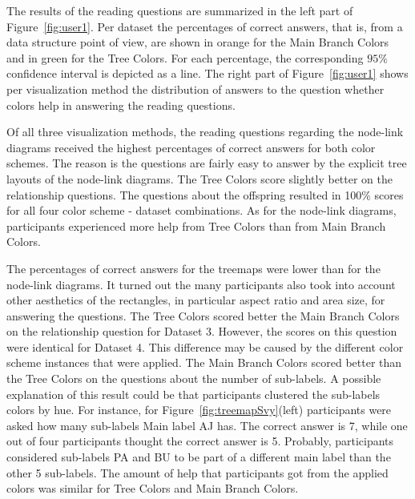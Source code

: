 \documentclass[review,journal]{vgtc}         %
\begin{document}
The results of the reading questions are summarized in the left part of Figure~\ref{fig:user1}. Per dataset the percentages of correct answers, that is, from a data structure point of view, are shown in orange for the Main Branch Colors and in green for the Tree Colors. For each percentage, the corresponding $95\%$ confidence interval is depicted as a line. The right part of Figure~\ref{fig:user1} shows per visualization method the distribution of answers to the question whether colors help in answering the reading questions.

Of all three visualization methods, the reading questions regarding the node-link diagrams received the highest percentages of correct answers for both color schemes. The reason is the questions are fairly easy to answer by the explicit tree layouts of the node-link diagrams. The Tree Colors score slightly better on the relationship questions. The questions about the offspring resulted in 100\% scores for all four color scheme - dataset combinations. As for the node-link diagrams, participants experienced more help from Tree Colors than from Main Branch Colors.


The percentages of correct answers for the treemaps were lower than for the node-link diagrams. It turned out the many participants also took into account other aesthetics of the rectangles, in particular aspect ratio and area size, for answering the questions. The Tree Colors scored better the Main Branch Colors on the relationship question for Dataset 3. However, the scores on this question were identical for Dataset 4. This difference may be caused by the different color scheme instances that were applied. The Main Branch Colors scored better than the Tree Colors on the questions about the number of sub-labels. A possible explanation of this result could be that participants clustered the sub-labels colors by hue. For instance, for Figure~\ref{fig:treemapSvy}(left) participants were asked how many sub-labels Main label AJ has. The correct answer is 7, while one out of four participants thought the correct answer is 5. Probably, participants considered sub-labels PA and BU to be part of a different main label than the other 5 sub-labels. The amount of help that participants got from the applied colors was similar for Tree Colors and Main Branch Colors.
\end{document}
